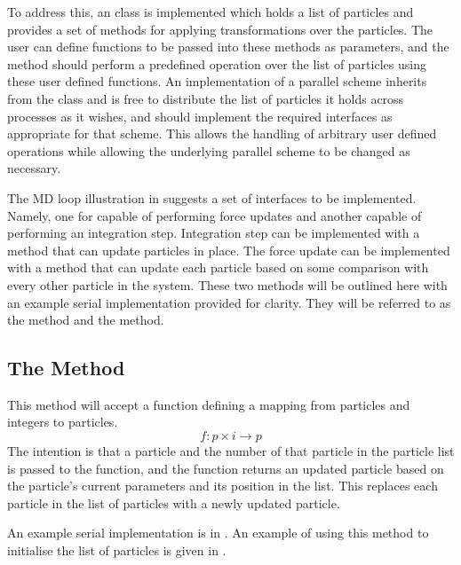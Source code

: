To address this, an \abstractdistribution{} class is implemented
which holds a list of particles and
provides a set of methods for
applying transformations over the particles.
%
The user can define functions to be passed into these methods
as parameters, and the method should perform a predefined operation
over the list of particles using these user defined functions.
%
An implementation of a parallel scheme inherits from the
\abstractdistribution{} class and is free to distribute
the list of particles it holds across processes as it wishes,
and should implement the required interfaces as appropriate for that scheme.
%
This allows the handling of arbitrary user defined operations while
allowing the underlying parallel scheme to be changed as necessary.

%
The MD loop illustration in
suggests a set of interfaces to be implemented.
%
Namely, one for capable of performing force updates and another
capable of performing an integration step.
%
Integration step can be implemented with a method that can update particles
in place.
%
The force update can be implemented with a method that can
update each particle based on some
comparison with every other particle in the system.
%
These two methods will be outlined here with an example serial
implementation provided for clarity.
%
They will be referred to as the \individualoperation{} method and
the \pairoperation{} method.


\subsection{The \individualoperation{} Method}
\label{sec:the_individual_operation_method}

This method will accept a function defining a mapping from
particles and integers to particles.
\begin{equation}
    f: p\times{}i \rightarrow{} p
\end{equation}
%
The intention is that a particle and the number of that particle in
the particle list is passed to the function, and the function
returns an updated particle based on the particle's current parameters
and its position in the list.
%
This replaces each particle in the list of particles with
a newly updated particle.

An example serial implementation is in
.
An example of using this method to initialise the list of
particles is given in
.

